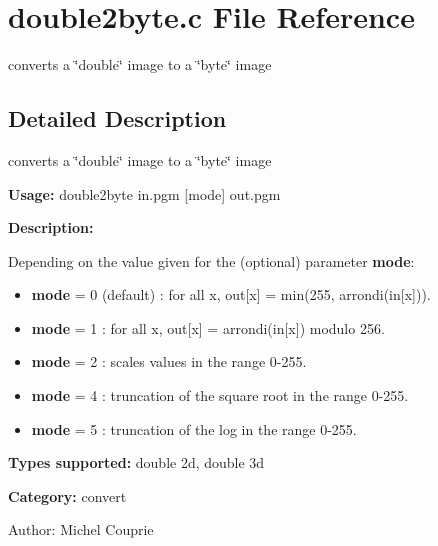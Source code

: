 \section{double2byte.c File Reference}
\label{double2byte_8c}
converts a \char`\"{}double\char`\"{} image to a \char`\"{}byte\char`\"{} image  




\label{_details}
\subsection{Detailed Description}
converts a \char`\"{}double\char`\"{} image to a \char`\"{}byte\char`\"{} image 

{\bf Usage:} double2byte in.pgm [mode] out.pgm

{\bf Description:}

Depending on the value given for the (optional) parameter {\bf mode}: \begin{itemize}
\item {\bf mode} = 0 (default) : for all x, out[x] = min(255, arrondi(in[x])). \item {\bf mode} = 1 : for all x, out[x] = arrondi(in[x]) modulo 256. \item {\bf mode} = 2 : scales values in the range 0-255. \item {\bf mode} = 4 : truncation of the square root in the range 0-255. \item {\bf mode} = 5 : truncation of the log in the range 0-255.\end{itemize}
{\bf Types supported:} double 2d, double 3d

{\bf Category:} convert

\begin{Desc}
\item[Author:]Michel Couprie \end{Desc}
